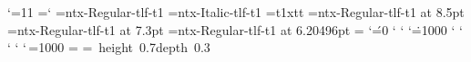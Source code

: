 %
%
%
\def\makeatletter{\catcode`\@=11 }%
\def\makeatother{\catcode`\@=12 }%
\makeatletter%
%
\newcount\tempcnt@i {} %
%
\def\setparam #1#2{%
  \ifx#1\undefined\else%
    #1=#2\relax%
  \fi%
}%
\newbox\strutbox%
=`\-%
\font\tenntxregt=ntx-Regular-tlf-t1\relax%
\font\tenntxit=ntx-Italic-tlf-t1\relax%
\font\tentxtt=t1xtt\relax \hyphenchar{} %
\font\ninentxregt=ntx-Regular-tlf-t1 at 8.5pt\relax%
\font\fnmarkref=ntx-Regular-tlf-t1 at 7.3pt\relax%
\font\fnmarktext=ntx-Regular-tlf-t1 at 6.20496pt\relax%
\boxmaxdepth=\maxdimen%
\sfcode`\'=0 \sfcode` \sfcode` \sfcode`\.=1000 \sfcode` %
\sfcode` \sfcode` \sfcode` \sfcode`\,=1000 %
\spaceskip=0pt\relax%
\xspaceskip=0pt\relax%
\def\makestrutbox{%
  \setbox\strutbox=\hbox{%
    \vrule width 0pt height 0.7\baselineskip depth 0.3\baselineskip%
  }%
}%
\def\normal{%
  \tenntxregt%
  \baselineskip=12pt\relax%
  \abovedisplayskip=10pt\relax%
  \belowdisplayskip=\abovedisplayskip\relax%
  \abovedisplayshortskip=0pt\relax%
  \belowdisplayshortskip=6pt\relax%
  \makestrutbox%
  \def\fnmarkfont{%
    \fnmarkref%
    \baselineskip=7.3pt\relax%
  }%
}%
\def\small{%
  \ninentxregt%
  \baselineskip=10pt\relax%
  \abovedisplayskip=8.5pt\relax%
  \belowdisplayskip=\abovedisplayskip\relax%
  \abovedisplayshortskip=0pt\relax%
  \belowdisplayshortskip=4pt\relax%
  \makestrutbox%
  \def\fnmarkfont{%
    \fnmarktext%
    \baselineskip=6.20496pt\relax%
  }%
}%
\normal%
\tabskip=0pt\relax%
